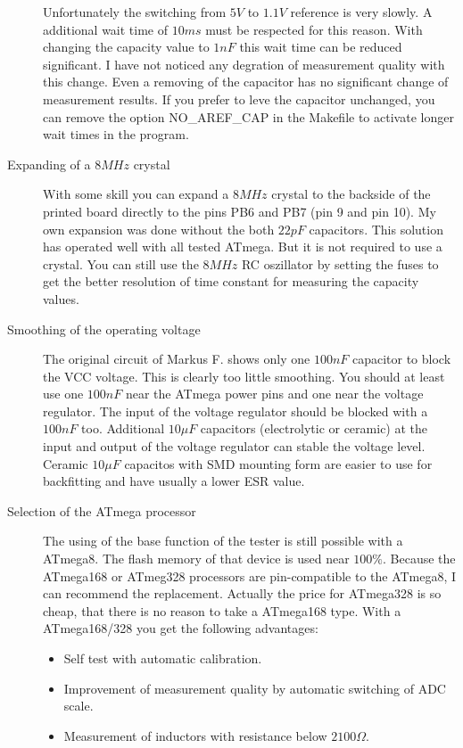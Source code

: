 \begin{description}
Unfortunately the switching from \(5V\) to \(1.1V\) reference is very slowly. A additional
wait time of \(10ms\) must be respected for this reason.
With changing the capacity value to \(1nF\) this wait time can be reduced significant.
I have not noticed any degration of measurement quality with this change.
Even a removing of the capacitor has no significant change of measurement results.
If you prefer to leve the capacitor unchanged, you can remove the option NO\_AREF\_CAP
in the Makefile to activate longer wait times in the program.
\item[Expanding of a \(8MHz\) crystal]
With some skill you can expand a \(8MHz\) crystal to the backside of the printed board
directly to the pins PB6 and PB7 (pin 9 and pin 10).
My own expansion was done without the both \(22pF\) capacitors.
This solution has operated well with all tested ATmega.
But it is not required to use a crystal. You can still use the \(8MHz\) RC oszillator
by setting the fuses to get the better resolution of time constant for measuring  the capacity values.
\item[Smoothing of the operating voltage]
The original circuit of Markus F. shows only one \(100nF\) capacitor to block the VCC voltage.
This is clearly too little smoothing. You should at least use one \(100nF\) near the ATmega power pins
and one near the voltage regulator. The input of the voltage regulator should be
blocked with a \(100nF\) too.
Additional \(10\mu F\) capacitors (electrolytic or ceramic) at the input and
output of the voltage regulator can stable the voltage level.
Ceramic \(10\mu F\) capacitos with SMD mounting form are easier to use for backfitting
and have usually a lower ESR value. 
\item[Selection of the ATmega processor]
The using of the base function of the tester is still possible with a ATmega8.
The flash memory of that device is used near \(100\%\).
Because the ATmega168 or ATmeg328 processors are pin-compatible to the ATmega8,
I can recommend the replacement.
Actually the price for ATmega328 is so cheap, that there is no reason to take
a ATmega168 type.
With a ATmega168/328 you get the following advantages:
 \begin{itemize} \setlength{\itemsep}{-1.5em}
 \item Self test with automatic calibration.\\
 \item Improvement of measurement quality by automatic switching of ADC scale.\\
 \item Measurement of inductors with resistance  below \(2100\Omega\).\\

\end{itemize}
\end{description}
